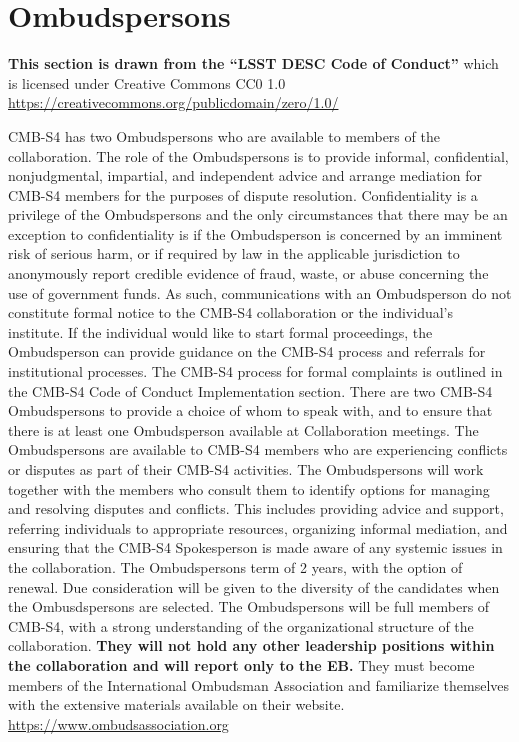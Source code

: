 \documentclass[12pt]{article}
\begin{document}


\section{Ombudspersons}

{\bf This section is drawn from the “LSST DESC Code of Conduct”} which is licensed under Creative Commons CC0 1.0 \url{https://creativecommons.org/publicdomain/zero/1.0/}

CMB-S4 has two Ombudspersons who are available to members of the collaboration. The role of the Ombudspersons is to provide informal, confidential, nonjudgmental, impartial, and independent advice and arrange mediation for CMB-S4 members for the purposes of dispute resolution. Confidentiality is a privilege of the Ombudspersons and the only circumstances that there may be an exception to confidentiality is if the Ombudsperson is concerned by an imminent risk of serious harm, or if required by law in the applicable jurisdiction to anonymously report credible evidence of fraud, waste, or abuse concerning the use of government funds. As such, communications with an Ombudsperson do not constitute formal notice to the CMB-S4 collaboration or the individual's institute. If the individual would like to start formal proceedings, the Ombudsperson can provide guidance on the CMB-S4 process and referrals for institutional processes. The CMB-S4 process for formal complaints is outlined in the CMB-S4 Code of Conduct Implementation section. There are two CMB-S4 Ombudspersons to provide a choice of whom to speak with, and to ensure that there is at least one Ombudsperson available at Collaboration meetings. The Ombudspersons are available to CMB-S4 members who are experiencing conflicts or disputes as part of their CMB-S4 activities. The Ombudspersons will work together with the members who consult them to identify options for managing and resolving disputes and conflicts. This includes providing advice and support, referring individuals to appropriate resources, organizing informal mediation, and ensuring that the CMB-S4 Spokesperson is made aware of any systemic issues in the collaboration. The Ombudspersons term of 2 years, with the option of renewal. Due consideration will be given to the diversity of the candidates when the Ombusdspersons are selected. The Ombudspersons will be full members of CMB-S4, with a strong understanding of the organizational structure of the collaboration. \textbf{They will not hold any other leadership positions within the collaboration and will report only to the EB.} They must become members of the International Ombudsman Association and familiarize themselves with the extensive materials available on their website. \url{https://www.ombudsassociation.org}
\end{document}

